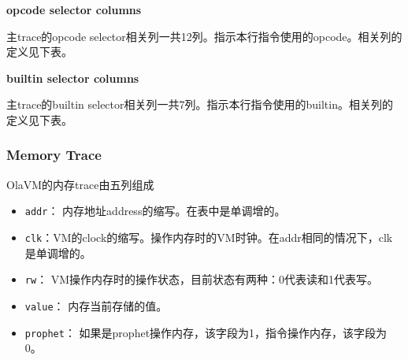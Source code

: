 \textbf{opcode selector columns}

主trace的opcode selector相关列一共12列。指示本行指令使用的opcode。相关列的定义见下表。
\begin{table}[!ht]
    \centering {}
    \caption{OlaVM的main trace表opcode selector相关列结构}
    \label{table: olavm-trace-table-opcode-selector}
\end{table}

\textbf{builtin selector columns}

主trace的builtin selector相关列一共7列。指示本行指令使用的builtin。相关列的定义见下表。
\begin{table}[!ht]
    \centering {}
    \caption{OlaVM的main trace表builtin selector相关列结构}
    \label{table: olavm-trace-table-builtin-selector}
\end{table}



\subsubsection{Memory Trace}\label{subsubsec: olavm-trace-memory}
OlaVM的内存trace由五列组成
\begin{itemize}
    \item \verb|addr|： 内存地址address的缩写。在表中是单调增的。
    \item \verb|clk|：VM的clock的缩写。操作内存时的VM时钟。在addr相同的情况下，clk是单调增的。
    \item \verb|rw|： VM操作内存时的操作状态，目前状态有两种：0代表读和1代表写。
    \item \verb|value|： 内存当前存储的值。
    \item \verb|prophet|： 如果是prophet操作内存，该字段为1，指令操作内存，该字段为0。
\end{itemize}


